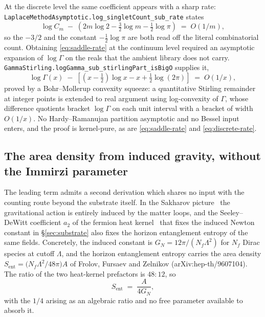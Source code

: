 \documentclass[aps,prd,nofootinbib,superscriptaddress,12pt]{revtex4-2}
\DeclareRobustCommand{\lb}{\discretionary{}{}{}}
\begin{document}
At the discrete level the same coefficient appears with a sharp rate:
\texttt{Laplace\lb{}Method\lb{}Asymptotic.\lb{}log\_\lb{}singlet\lb{}Count\_\lb{}sub\_\lb{}rate} states
\begin{equation}
\label{eq:discrete-rate}
\log C_m \;-\; \left(2m\log 2 - \tfrac{3}{2}\log m - \tfrac{1}{2}\log\pi\right) \;=\; O(1/m) ,
\end{equation}
so the $-3/2$ and the constant $-\tfrac12\log\pi$ are both read off the literal
combinatorial count. Obtaining \eqref{eq:saddle-rate} at the continuum level required an
asymptotic expansion of $\log\Gamma$ on the reals that the ambient library does not carry.
\texttt{Gamma\lb{}Stirling.\lb{}log\lb{}Gamma\_\lb{}sub\_\lb{}stirling\lb{}Part\_\lb{}is\lb{}Big\lb{}O} supplies it,
\begin{equation}
\label{eq:gamma-stirling}
\log\Gamma(x) \;-\; \left[\left(x-\tfrac12\right)\log x - x + \tfrac12\log(2\pi)\right] \;=\; O(1/x) ,
\end{equation}
proved by a Bohr--Mollerup convexity squeeze: a quantitative Stirling remainder at integer
points is extended to real argument using log-convexity of $\Gamma$, whose difference
quotients bracket $\log\Gamma$ on each unit interval with a bracket of width $O(1/x)$. No
Hardy--Ramanujan partition asymptotic and no Bessel input enters, and the proof is
kernel-pure, as are \eqref{eq:saddle-rate} and \eqref{eq:discrete-rate}.

\subsection{The area density from induced gravity, without the Immirzi parameter}
\label{sec:entropy-quarter}

The leading term admits a second derivation which shares no input with the counting route
beyond the substrate itself. In the Sakharov picture~\cite{Sakharov1968} the gravitational
action is entirely induced by the matter loops, and the Seeley--DeWitt coefficient $a_2$ of
the fermion heat kernel~\cite{Vassilevich2003} that fixes the induced Newton constant in
\S\ref{sec:substrate} also fixes the horizon entanglement entropy of the same fields.
Concretely, the induced constant is $G_N = 12\pi/(N_f\Lambda^2)$ for $N_f$ Dirac species at
cutoff $\Lambda$, and the horizon entanglement entropy carries the area density
$S_{\mathrm{ent}} = \bigl(N_f\Lambda^2/48\pi\bigr)A$ of Frolov, Fursaev and Zelnikov
(arXiv:hep-th/9607104). The ratio of the two heat-kernel prefactors is $48:12$, so
\begin{equation}
\label{eq:ff-quarter}
S_{\mathrm{ent}} \;=\; \frac{A}{4G_N} ,
\end{equation}
with the $1/4$ arising as an algebraic ratio and no free parameter available to absorb it.
\end{document}
